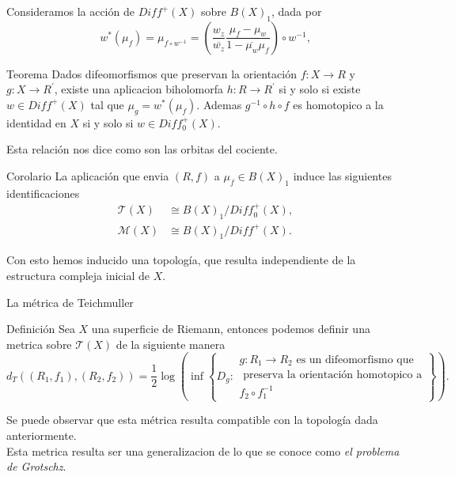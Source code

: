 \documentclass[xcolor=dvipsnames,10pt]{beamer}
\begin{document}
\begin{frame}
    Consideramos la acción de $Diff^+(X)$ sobre $B(X)_1$, dada por
    $$w^*(\mu_f)=\mu_{f\circ w^{-1}}=\left(\frac{w_z}{\overline{w_z}}\frac{\mu_f-\mu_w}{1-\overline{\mu_w}\mu_f}\right)\circ w^{-1},$$
    \begin{block}{Teorema}
        Dados difeomorfismos que preservan la orientación $f:X\to R$ y $g:X\to R^\prime$, existe una aplicacion biholomorfa $h:R\to R^\prime$ si y solo si existe $w\in Diff^+(X)$ tal que $\mu_g=w^*(\mu_f).$ Ademas $g^{-1}\circ h\circ f$ es homotopico a la identidad en $X$ si y solo si $w\in Diff_0^+(X).$ 
    \end{block}
    Esta relación nos dice como son las orbitas del cociente.
    \begin{block}{Corolario}
        La aplicación que envia $(R,f)$ a $\mu_f\in B(X)_1$ induce las siguientes identificaciones
        \begin{align*}
           \mathcal{T}(X)&\cong B(X)_1/Diff_0^+(X),\\
           \mathcal{M}(X)&\cong B(X)_1/Diff^+(X). 
        \end{align*}
    \end{block}
    Con esto hemos inducido una topología, que resulta independiente de la estructura compleja inicial de $X.$
\end{frame}
\begin{frame}{La métrica de Teichmuller}
\begin{block}{Definición}
    Sea $X$ una superficie de Riemann, entonces podemos definir una metrica sobre $\mathcal{T}(X)$ de la siguiente manera
    $$d_T((R_1,f_1),(R_2,f_2))=\frac{1}{2}\log\left(\inf\left\{D_g:\begin{array}{c} g:R_1\to R_2 \text{ es un difeomorfismo que}\\\text{ preserva la orientación homotopico a}\\f_2\circ f_1^{-1}\end{array}\right\}\right).$$
\end{block}
Se puede observar que esta métrica resulta compatible con la topología dada anteriormente.\\

Esta metrica resulta ser una generalizacion de lo que se conoce como \textit{el problema de Grotschz}.
    
\end{frame}
\end{document}

